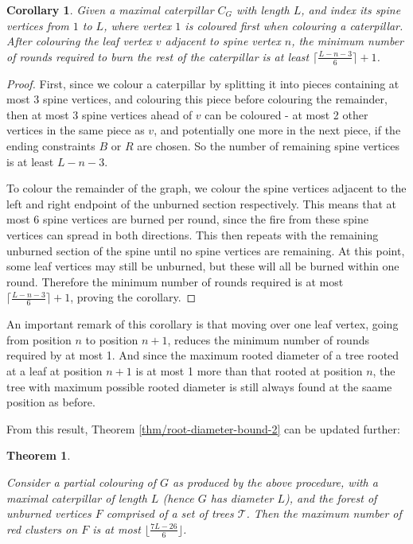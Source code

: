 \documentclass{mpaper}
\newtheorem{corollary}{Corollary}[section]
\newtheorem{theorem}{Theorem}[section]
\begin{document}
\begin{corollary}
  \label{cor/min_rounds_caterpillar}
  Given a maximal caterpillar $C_G$ with length $L$, and index its spine vertices from $1$ to $L$, where vertex $1$ is coloured first when colouring a caterpillar. After colouring the leaf vertex $v$ adjacent to spine vertex $n$, the minimum number of rounds required to burn the rest of the caterpillar is at least $\lceil \frac{L-n-3}{6} \rceil + 1$.
\end{corollary}
\begin{proof}
First, since we colour a caterpillar by splitting it into pieces containing at most 3 spine vertices, and colouring this piece before colouring the remainder, then at most 3 spine vertices ahead of $v$ can be coloured - at most 2 other vertices in the same piece as $v$, and potentially one more in the next piece, if the ending constraints $B$ or $R$ are chosen. So the number of remaining spine vertices is at least $L - n - 3$.

To colour the remainder of the graph, we colour the spine vertices adjacent to the left and right endpoint of the unburned section respectively. This means that at most 6 spine vertices are burned per round, since the fire from these spine vertices can spread in both directions. This then repeats with the remaining unburned section of the spine until no spine vertices are remaining. At this point, some leaf vertices may still be unburned, but these will all be burned within one round. Therefore the minimum number of rounds required is at most $\lceil \frac{L-n-3}{6} \rceil + 1$, proving the corollary.
\end{proof}

An important remark of this corollary is that moving over one leaf vertex, going from position $n$ to position $n+1$, reduces the minimum number of rounds required by at most 1. And since the maximum rooted diameter of a tree rooted at a leaf at position $n+1$ is at most 1 more than that rooted at position $n$, the tree with maximum possible rooted diameter is still always found at the saame position as before.

From this result, Theorem \ref{thm/root-diameter-bound-2} can be updated further:

\begin{theorem}
  \label{thm/root-diameter-bound-3}
  
  Consider a partial colouring of $G$ as produced by the above procedure, with a maximal caterpillar of length $L$ (hence $G$ has diameter $L$), and the forest of unburned vertices $F$ comprised of a set of trees $\mathcal{T}$. Then the maximum number of red clusters on $F$ is at most $\lfloor \frac{7L-26}{6} \rfloor$.
  
  \end{theorem}
\end{document}
